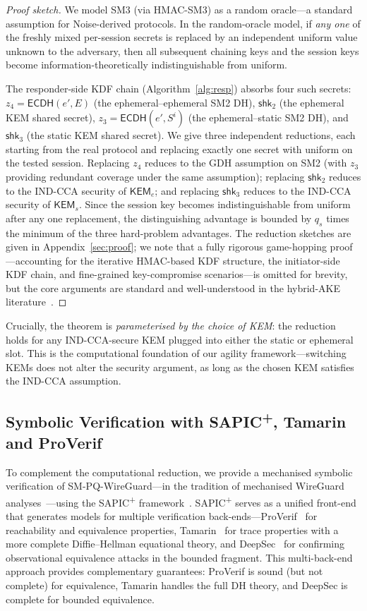 \documentclass{SCIS2026}
\newcommand{\KEMs}{\textsf{KEM}_s}
\newcommand{\KEMe}{\textsf{KEM}_e}
\newcommand{\ECDH}{\mathsf{ECDH}}
\begin{document}
\begin{proof}[Proof sketch]
We model SM3 (via HMAC-SM3) as a random oracle---a standard
assumption for Noise-derived protocols.  In the random-oracle model,
if \emph{any one} of the freshly mixed per-session secrets is replaced
by an independent uniform value unknown to the adversary, then all
subsequent chaining keys and the session keys become
information-theoretically indistinguishable from uniform.

The responder-side KDF chain (Algorithm~\ref{alg:resp}) absorbs four
such secrets: $z_4 = \ECDH(e', E)$ (the ephemeral--ephemeral SM2 DH),
$\textsf{shk}_2$ (the ephemeral KEM shared secret), $z_3 =
\ECDH(e', S^i)$ (the ephemeral--static SM2 DH), and
$\textsf{shk}_3$ (the static KEM shared secret).  We give three
independent reductions, each starting from the real protocol and
replacing exactly one secret with uniform on the tested session.
Replacing $z_4$ reduces to the GDH assumption on SM2 (with $z_3$
providing redundant coverage under the same assumption); replacing
$\textsf{shk}_2$ reduces to the IND-CCA security of $\KEMe$; and
replacing $\textsf{shk}_3$ reduces to the IND-CCA security of $\KEMs$.
Since the session key becomes indistinguishable from uniform after
any one replacement, the distinguishing advantage is bounded by
$q_s$ times the minimum of the three hard-problem advantages.
The reduction sketches are given in Appendix~\ref{sec:proof}; we note
that a fully rigorous game-hopping proof---accounting for the iterative
HMAC-based KDF structure, the initiator-side KDF chain, and fine-grained
key-compromise scenarios---is omitted for brevity, but the core
arguments are standard and well-understood in the hybrid-AKE
literature~\cite{14,32}.
\end{proof}

Crucially, the theorem is \emph{parameterised by the choice of KEM}:
the reduction holds for any IND-CCA-secure KEM plugged into either the
static or ephemeral slot.  This is the computational foundation of our
agility framework---switching KEMs does not alter the security
argument, as long as the chosen KEM satisfies the IND-CCA assumption.

\subsection{Symbolic Verification with SAPIC\textsuperscript{+},
            Tamarin and ProVerif}
\label{sec:symbolic}

To complement the computational reduction, we provide a mechanised
symbolic verification of SM-PQ-WireGuard---in the tradition of
mechanised WireGuard analyses~\cite{35}---using the
SAPIC\textsuperscript{+} framework~\cite{36}.
SAPIC\textsuperscript{+} serves as a unified front-end that generates
models for multiple verification back-ends---ProVerif~\cite{37}
for reachability and equivalence properties,
Tamarin~\cite{38} for trace properties with a more
complete Diffie--Hellman equational theory, and
DeepSec~\cite{39} for confirming observational
equivalence attacks in the bounded fragment.  This multi-back-end
approach provides complementary guarantees: ProVerif is sound (but not
complete) for equivalence, Tamarin handles the full DH theory, and
DeepSec is complete for bounded equivalence.
\end{document}
